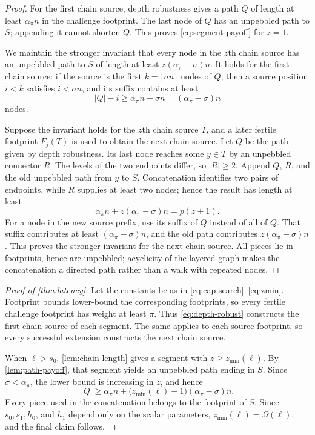 \documentclass[11pt]{article}
\theoremstyle{plain}
\theoremstyle{remark}
\begin{document}
\begin{proof}
For the first chain source, depth robustness gives a path \(Q\) of length at least
\(\alpha_\pi n\) in the challenge footprint.  The last node of \(Q\) has an
unpebbled path to \(S\); appending it cannot shorten \(Q\).  This proves
\eqref{eq:segment-payoff} for \(z=1\).

We maintain the stronger invariant that every node in the
\(z\)th chain source has an unpebbled path to \(S\) of length at least
\(z(\alpha_\pi-\sigma)n\).  It holds for the first chain source: if the source is the first
\(k=\lceil\sigma n\rceil\) nodes of \(Q\), then a source position \(i<k\)
satisfies \(i<\sigma n\), and its suffix contains at least
\[
 |Q|-i\ge\alpha_\pi n-\sigma n
       =(\alpha_\pi-\sigma)n
\]
nodes.

Suppose the invariant holds for the \(z\)th chain source \(T\), and a later
fertile footprint \(F_j(T)\) is used to obtain the next chain source.  Let \(Q\) be
the path
given by depth robustness.
Its last node reaches some \(y\in T\) by an unpebbled connector \(R\).  The
levels of the two endpoints differ, so \(|R|\ge2\).  Append \(Q\), \(R\), and the
old unpebbled path from \(y\) to \(S\).  Concatenation identifies two pairs of
endpoints, while \(R\) supplies at least two nodes; hence the result has length at least
\[
 \alpha_\pi n+z(\alpha_\pi-\sigma)n=p(z+1).
\]
For a node in the new source prefix, use its suffix of \(Q\) instead of all of
\(Q\).  That suffix contributes at least \((\alpha_\pi-\sigma)n\), and the old
path contributes \(z(\alpha_\pi-\sigma)n\).  This proves the stronger invariant
for the next chain source.  All pieces lie in footprints, hence are unpebbled;
acyclicity of the layered graph makes the concatenation a directed path rather than a
walk with repeated nodes.
\end{proof}

\begin{proof}[Proof of \cref{thm:latency}]
Let the constants be as in \eqref{eq:cap-search}--\eqref{eq:zmin}.  Footprint bounds
lower-bound the corresponding footprints, so every fertile challenge footprint has
weight at least \(\pi\).  Thus \eqref{eq:depth-robust} constructs the first chain source of
each segment.  The same applies to each source footprint, so every successful extension
constructs the next chain source.

When \(\ell>s_0\), \cref{lem:chain-length} gives a segment with
\(z\ge z_{\min}(\ell)\).
By \cref{lem:path-payoff}, that segment yields an unpebbled path ending in \(S\).
Since \(\sigma<\alpha_\pi\), the lower bound is increasing in \(z\), and hence
\[
 |Q|\ge
 \alpha_\pi n+
 \bigl(z_{\min}(\ell)-1\bigr)
 (\alpha_\pi-\sigma)n.
\]
Every piece used in the concatenation belongs to the footprint of \(S\).
Since \(s_0,s_1,h_0\), and \(h_1\) depend only on the scalar parameters,
\(z_{\min}(\ell)=\Omega(\ell)\), and the final claim follows.
\end{proof}
\end{document}
